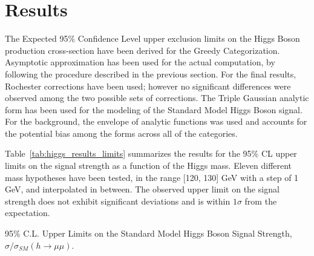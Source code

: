 \section{Results} \label{section:higgs_results}
The Expected 95\% Confidence Level upper exclusion limits on the Higgs Boson production cross-section have been derived for the Greedy Categorization. Asymptotic approximation has been used for the actual computation, by following the procedure described in the previous section. For the final results, Rochester corrections have been used; however no significant differences were observed among the two possible sets of corrections. The Triple Gaussian analytic form has been used for the modeling of the Standard Model Higgs Boson signal. For the background, the envelope of analytic functions was used and accounts for the potential bias among the forms across all of the categories.

Table~\ref{tab:higgs_results_limits} summarizes the results for the 95\% CL upper limits on the signal strength as a function of the Higgs mass. Eleven different mass hypotheses have been tested, in the range [120, 130] GeV with a step of 1 GeV, and interpolated in between. The observed upper limit on the signal strength does not exhibit significant deviations and is within $1\sigma$ from the expectation.
\begin{table}[htbp]
    \centering
    \caption{95\% C.L. Upper Limits on the Standard Model Higgs Boson Signal Strength, $\sigma/\sigma_{SM}(h\rightarrow \mu\mu)$.}
    
    \label{tab:higgs_results_limits}
\end{table}

